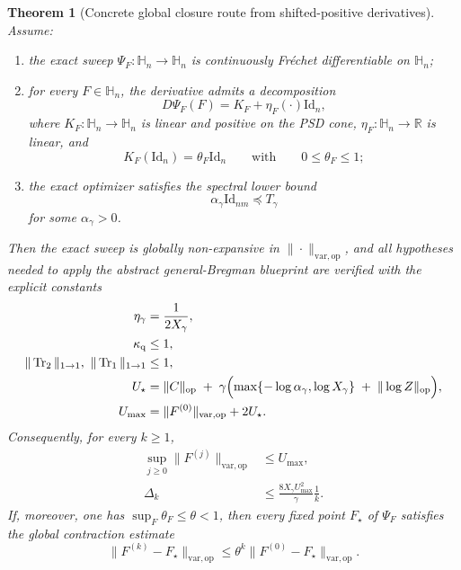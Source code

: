 \documentclass[11pt]{article}
\newcommand{\RR}{\mathbb{R}}
\newcommand{\Id}{\mathrm{Id}}
\newcommand{\Trone}{\operatorname{Tr}_{1}}
\newcommand{\Trtwo}{\operatorname{Tr}_{2}}
\newcommand{\Hh}{\mathbb{H}}
\newcommand{\op}{\mathrm{op}}
\newcommand{\varop}{\mathrm{var},\op}
\theoremstyle{plain}
\newtheorem{theorem}{Theorem}[section]
\begin{document}
\begin{theorem}[Concrete global closure route from shifted-positive derivatives]
\label{thm:qot-concrete-global-route}
Assume:
\begin{enumerate}[label=\textnormal{(\roman*)}]
\item the exact sweep $\Psi_F:\Hh_n\to\Hh_n$ is continuously Fr\'echet differentiable on $\Hh_n$;
\item for every $F\in \Hh_n$, the derivative admits a decomposition
\[
D\Psi_F(F)=K_F+\eta_F(\cdot)\Id_n,
\]
where $K_F:\Hh_n\to\Hh_n$ is linear and positive on the PSD cone, $\eta_F:\Hh_n\to\RR$ is linear, and
\[
K_F(\Id_n)=\theta_F \Id_n
\qquad\text{with}\qquad
0\le \theta_F\le 1;
\]
\item the exact optimizer satisfies the spectral lower bound
\[
\alpha_\gamma \Id_{nm}\preceq T_\gamma
\]
for some $\alpha_\gamma>0$.
\end{enumerate}
Then the exact sweep is globally non-expansive in $\|\cdot\|_{\varop}$, and all hypotheses needed to apply the abstract general-Bregman blueprint are verified with the explicit constants
\begin{align*}
\eta_\gamma &= \frac{1}{2X_\gamma},\\
\kappa_{\rm q} &\le 1,\\
\|\Trtwo\|_{1\to 1},\ \|\Trone\|_{1\to 1} &\le 1,\\
U_\star &=
\|C\|_{\op}
\;+\;
\gamma\Bigl(
\max\{-\log \alpha_\gamma,\log X_\gamma\}
\;+\;
\|\log Z\|_{\op}
\Bigr),\\
U_{\max} &= \|F^{(0)}\|_{\varop}+2U_\star.
\end{align*}
Consequently, for every $k\ge 1$,
\begin{align}
\sup_{j\ge 0}\|F^{(j)}\|_{\varop}
&\le
U_{\max},
\label{eq:qot-concrete-global-bound}\\
\Delta_k
&\le
\frac{8X_\gamma U_{\max}^2}{\gamma}\frac{1}{k}.
\label{eq:qot-concrete-global-rate}
\end{align}
If, moreover, one has $\sup_F \theta_F\le \theta<1$, then every fixed point $F_\star$ of $\Psi_F$ satisfies the global contraction estimate
\begin{equation}
\label{eq:qot-concrete-global-linear}
\|F^{(k)}-F_\star\|_{\varop}
\le
\theta^k\|F^{(0)}-F_\star\|_{\varop}.
\end{equation}
\end{theorem}
\end{document}
